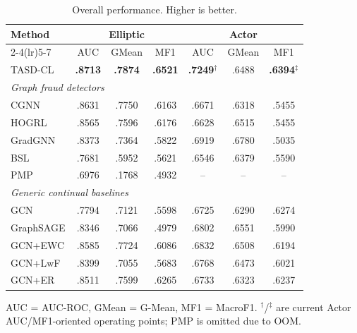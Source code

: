 \begin{table}[!htbp]
  \centering
  \caption{Overall performance. Higher is better.}
  \label{tab:overall-main}
  \scriptsize
  \setlength{\tabcolsep}{1.35pt}
  \begin{tabular*}{\columnwidth}{@{\extracolsep{\fill}}lcccccc@{}}
    \toprule
    Method & \multicolumn{3}{c}{Elliptic} & \multicolumn{3}{c}{Actor} \\
    \cmidrule(lr){2-4}\cmidrule(lr){5-7}
    & AUC & GMean & MF1 & AUC & GMean & MF1 \\
    \midrule
    TASD-CL & \textbf{.8713} & \textbf{.7874} & \textbf{.6521} & \textbf{.7249}$^\dagger$ & .6488 & \textbf{.6394}$^\ddagger$ \\
    \midrule
    \multicolumn{7}{l}{\emph{Graph fraud detectors}} \\
    CGNN & .8631 & .7750 & .6163 & .6671 & .6318 & .5455 \\
    HOGRL & .8565 & .7596 & .6176 & .6628 & .6515 & .5455 \\
    GradGNN & .8373 & .7364 & .5822 & .6919 & .6780 & .5035 \\
    BSL & .7681 & .5952 & .5621 & .6546 & .6379 & .5590 \\
    PMP & .6976 & .1768 & .4932 & -- & -- & -- \\
    \midrule
    \multicolumn{7}{l}{\emph{Generic continual baselines}} \\
    GCN & .7794 & .7121 & .5598 & .6725 & .6290 & .6274 \\
    GraphSAGE & .8346 & .7066 & .4979 & .6802 & .6551 & .5990 \\
    GCN+EWC & .8585 & .7724 & .6086 & .6832 & .6508 & .6194 \\
    GCN+LwF & .8399 & .7055 & .5683 & .6768 & .6473 & .6021 \\
    GCN+ER & .8511 & .7599 & .6265 & .6733 & .6323 & .6237 \\
    \bottomrule
  \end{tabular*}
  \vspace{1pt}
  \begin{minipage}{0.96\linewidth}
  \scriptsize
  AUC = AUC-ROC, GMean = G-Mean, MF1 = MacroF1. $^\dagger$/$^\ddagger$ are current Actor AUC/MF1-oriented operating points; PMP is omitted due to OOM.
  \end{minipage}
\end{table}
\FloatBarrier

